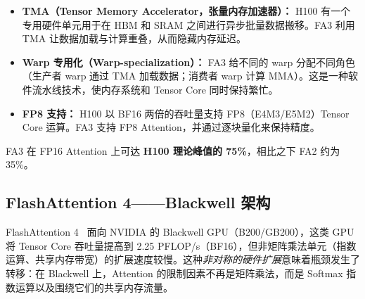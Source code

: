 \begin{itemize}
  \item \textbf{TMA（Tensor Memory Accelerator，张量内存加速器）：} H100 有一个专用硬件单元用于在 HBM 和 SRAM 之间进行异步批量数据搬移。FA3 利用 TMA 让数据加载与计算重叠，从而隐藏内存延迟。
  \item \textbf{Warp 专用化（Warp-specialization）：} FA3 给不同的 warp 分配不同角色（生产者 warp 通过 TMA 加载数据；消费者 warp 计算 MMA）。这是一种软件流水线技术，使内存系统和 Tensor Core 同时保持繁忙。
  \item \textbf{FP8 支持：} H100 以 BF16 两倍的吞吐量支持 FP8（E4M3/E5M2）Tensor Core 运算。FA3 支持 FP8 Attention，并通过逐块量化来保持精度。
\end{itemize}

FA3 在 FP16 Attention 上可达 \textbf{H100 理论峰值的 75\%}，相比之下 FA2 约为 35\%。

\subsection{FlashAttention 4——Blackwell 架构}
\label{flash-attention-4-blackwell-architecture}

FlashAttention 4~\cite{zadouri2026flashattention4} 面向 NVIDIA 的 Blackwell GPU（B200/GB200），这类 GPU 将 Tensor Core 吞吐量提高到 2.25 PFLOP/s（BF16），但非矩阵乘法单元（指数运算、共享内存带宽）的扩展速度较慢。这种\emph{非对称的硬件扩展}意味着瓶颈发生了转移：在 Blackwell 上，Attention 的限制因素不再是矩阵乘法，而是 Softmax 指数运算以及围绕它们的共享内存流量。

